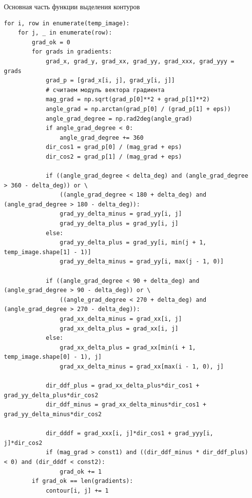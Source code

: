 \documentclass[14pt, russian]{scrartcl}
\begin{document}
\begin{listing}[!htt]
    \caption{Основная часть функции выделения контуров}
    \label{lst:cont_extr_func}
    \begin{verbatim}
for i, row in enumerate(temp_image):
    for j, _ in enumerate(row):
        grad_ok = 0
        for grads in gradients:
            grad_x, grad_y, grad_xx, grad_yy, grad_xxx, grad_yyy = grads
            grad_p = [grad_x[i, j], grad_y[i, j]]
            # считаем модуль вектора градиента
            mag_grad = np.sqrt(grad_p[0]**2 + grad_p[1]**2)
            angle_grad = np.arctan(grad_p[0] / (grad_p[1] + eps))
            angle_grad_degree = np.rad2deg(angle_grad)
            if angle_grad_degree < 0:  
                angle_grad_degree += 360
            dir_cos1 = grad_p[0] / (mag_grad + eps)
            dir_cos2 = grad_p[1] / (mag_grad + eps)

            if ((angle_grad_degree < delta_deg) and (angle_grad_degree > 360 - delta_deg)) or \
                ((angle_grad_degree < 180 + delta_deg) and (angle_grad_degree > 180 - delta_deg)):     
                grad_yy_delta_minus = grad_yy[i, j]
                grad_yy_delta_plus = grad_yy[i, j]
            else:
                grad_yy_delta_plus = grad_yy[i, min(j + 1, temp_image.shape[1] - 1)]
                grad_yy_delta_minus = grad_yy[i, max(j - 1, 0)]

            if ((angle_grad_degree < 90 + delta_deg) and (angle_grad_degree > 90 - delta_deg)) or \
                ((angle_grad_degree < 270 + delta_deg) and (angle_grad_degree > 270 - delta_deg)):
                grad_xx_delta_minus = grad_xx[i, j]
                grad_xx_delta_plus = grad_xx[i, j]
            else:
                grad_xx_delta_plus = grad_xx[min(i + 1, temp_image.shape[0] - 1), j]
                grad_xx_delta_minus = grad_xx[max(i - 1, 0), j]

            dir_ddf_plus = grad_xx_delta_plus*dir_cos1 + grad_yy_delta_plus*dir_cos2
            dir_ddf_minus = grad_xx_delta_minus*dir_cos1 + grad_yy_delta_minus*dir_cos2

            dir_dddf = grad_xxx[i, j]*dir_cos1 + grad_yyy[i, j]*dir_cos2     
            if (mag_grad > const1) and ((dir_ddf_minus * dir_ddf_plus) < 0) and (dir_dddf < const2):
                grad_ok += 1       
        if grad_ok == len(gradients):
            contour[i, j] += 1
    \end{verbatim}
\end{listing}
\end{document}
